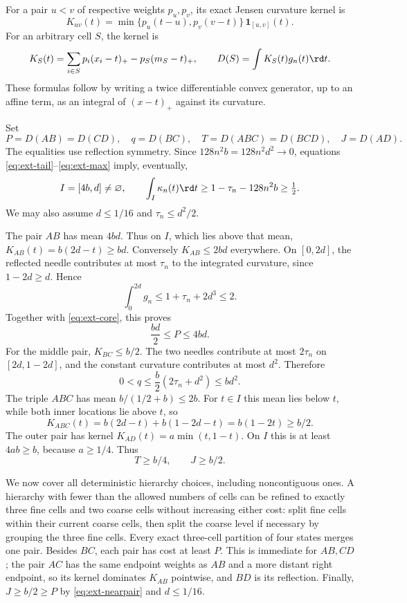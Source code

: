 For a pair $u<v$ of respective weights $p_u,p_v$, its exact Jensen curvature
kernel is
\begin{equation}
 K_{uv}(t)=\min\{p_u(t-u),p_v(v-t)\}\,
           \mathbf1_{[u,v]}(t).
 \label{eq:ext-pairkernel}
\end{equation}
For an arbitrary cell $S$, the kernel is
\[
 K_S(t)=\sum_{i\in S}p_i(x_i-t)_+-p_S(m_S-t)_+,
 \qquad D(S)=\int K_S(t)g_n(t)\rd t.
\]
These formulas follow by writing a twice differentiable convex generator,
up to an affine term, as an integral of $(x-t)_+$ against its curvature.

Set
\[
 P=D(AB)=D(CD),\quad q=D(BC),\quad
 T=D(ABC)=D(BCD),\quad J=D(AD).
\]
The equalities use reflection symmetry. Since
$128n^2b=128n^2d^2\to0$, equations
\eqref{eq:ext-tail}--\eqref{eq:ext-max} imply, eventually,
\begin{equation}
 I=[4b,d]\ne\varnothing,\qquad
 \int_I\kappa_n(t)\rd t
 \ge1-\tau_n-128n^2b\ge\tfrac12.
 \label{eq:ext-core}
\end{equation}
We may also assume $d\le1/16$ and $\tau_n\le d^2/2$.

The pair $AB$ has mean $4bd$. Thus on $I$, which lies above that mean,
$K_{AB}(t)=b(2d-t)\ge bd$. Conversely $K_{AB}\le2bd$ everywhere.
On $[0,2d]$, the reflected needle contributes at most $\tau_n$ to the
integrated curvature, since $1-2d\ge d$. Hence
\[
 \int_0^{2d}g_n\le1+\tau_n+2d^3\le2.
\]
Together with \eqref{eq:ext-core}, this proves
\begin{equation}
 \frac{bd}{2}\le P\le4bd.
 \label{eq:ext-nearpair}
\end{equation}
For the middle pair, $K_{BC}\le b/2$. The two needles contribute at most
$2\tau_n$ on $[2d,1-2d]$, and the constant curvature contributes at most
$d^2$. Therefore
\begin{equation}
 0<q\le\frac b2(2\tau_n+d^2)\le bd^2.
 \label{eq:ext-middlepair}
\end{equation}
The triple $ABC$ has mean $b/(1/2+b)\le2b$. For $t\in I$ this mean lies
below $t$, while both inner locations lie above $t$, so
\[
 K_{ABC}(t)=b(2d-t)+b(1-2d-t)=b(1-2t)\ge b/2.
\]
The outer pair has kernel $K_{AD}(t)=a\min(t,1-t)$. On $I$ this is at
least $4ab\ge b$, because $a\ge1/4$. Thus
\begin{equation}
 T\ge b/4,\qquad J\ge b/2.
 \label{eq:ext-coarse}
\end{equation}

We now cover all deterministic hierarchy choices, including noncontiguous
ones. A hierarchy with fewer than the allowed numbers of cells can be
refined to exactly three fine cells and two coarse cells without increasing
either cost: split fine cells within their current coarse cells, then split
the coarse level if necessary by grouping the three fine cells. Every exact
three-cell partition of four states merges one pair. Besides $BC$, each
pair has cost at least $P$. This is immediate for $AB,CD$; the pair $AC$
has the same endpoint weights as $AB$ and a more distant right endpoint,
so its kernel dominates $K_{AB}$ pointwise, and $BD$ is its reflection.
Finally, $J\ge b/2\ge P$ by \eqref{eq:ext-nearpair} and $d\le1/16$.

